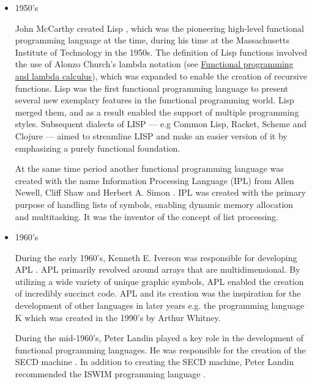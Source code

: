 \documentclass[a4paper, titlepage, twoside]{article}
\begin{document}
\begin{itemize}
\item 1950's

John McCarthy created Lisp \autocite{mccarthyRecursiveFunctionsSymbolic1960}, which was the pioneering high-level functional programming language at the time, during his time at the Massachusetts Institute of Technology in the 1950s. The definition of Lisp functions involved the use of Alonzo Church's lambda notation (see \hyperref[sec:org30410ed]{Functional programming and lambda calculus}), which was expanded to enable the creation of recursive functions. Lisp was the first functional programming language to present several new exemplary features in the functional programming world. Lisp merged them, and as a result enabled the support of multiple programming styles. Subsequent dialects of LISP --- e.g Common Lisp, Racket, Scheme and Clojure \autocite{steeleCOMMONLISPLanguage1984,felleisenRacketManifesto2015,abelsonRevisedReportAlgorithmic1998,hickeyHistoryClojure2020} --- aimed to streamline LISP and make an easier version of it by emphasizing a purely functional foundation.

At the same time period another functional programming language was created with the name Information Processing Language (IPL) from Allen Newell, Cliff Shaw and Herbert A. Simon \autocite{newellIntroductionInformationProcessing1960}. IPL was created with the primary purpose of handling lists of symbols, enabling dynamic memory allocation and multitasking. It was the inventor of the concept of list processing.

\item 1960's

During the early 1960's, Kenneth E. Iverson was responsible for developing APL \autocite{iversonProgrammingLanguage1962}. APL primarily revolved around arrays that are multidimensional. By utilizing a wide variety of unique graphic symbols, APL enabled the creation of incredibly succinct code. APL and its creation was the inspiration for the development of other languages in later years e.g. the programming language K which was created in the 1990's by Arthur Whitney.

During the mid-1960's, Peter Landin played a key role in the development of functional programming languages. He was responsible for the creation of the SECD machine \autocite{landinMechanicalEvaluationExpressions1964}. In addition to creating the SECD machine, Peter Landin recommended the ISWIM programming language \autocite{landinNext700Programming1966}.


\end{itemize}
\end{document}
